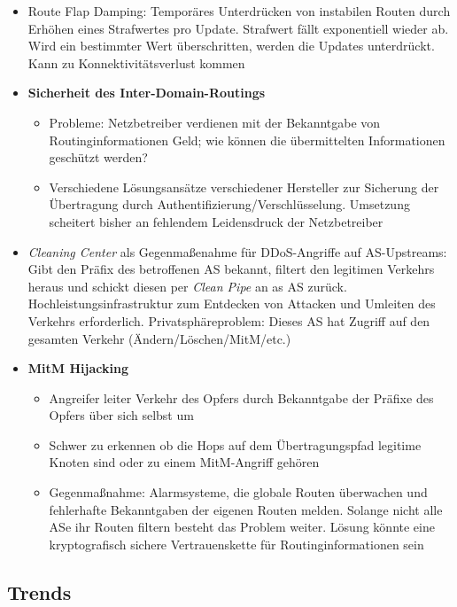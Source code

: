 \begin{itemize}
	\item Route Flap Damping: Temporäres Unterdrücken von instabilen Routen durch Erhöhen eines Strafwertes pro Update. Strafwert fällt exponentiell wieder ab. Wird ein bestimmter Wert überschritten, werden die Updates unterdrückt. Kann zu Konnektivitätsverlust kommen
	\item \textbf{Sicherheit des Inter-Domain-Routings}
	\begin{itemize}
		\item Probleme: Netzbetreiber verdienen mit der Bekanntgabe von Routinginformationen Geld; wie können die übermittelten Informationen geschützt werden?
		\item Verschiedene Lösungsansätze verschiedener Hersteller zur Sicherung der Übertragung durch Authentifizierung/Verschlüsselung. Umsetzung scheitert bisher an fehlendem Leidensdruck der Netzbetreiber
	\end{itemize}
	\item \textit{Cleaning Center} als Gegenmaßenahme für DDoS-Angriffe auf AS-Upstreams: Gibt den Präfix des betroffenen AS bekannt, filtert den legitimen Verkehrs heraus und schickt diesen per \textit{Clean Pipe} an as AS zurück. Hochleistungsinfrastruktur zum Entdecken von Attacken und Umleiten des Verkehrs erforderlich. Privatsphäreproblem: Dieses AS hat Zugriff auf den gesamten Verkehr (Ändern/Löschen/MitM/etc.)
	\item \textbf{MitM Hijacking}
	\begin{itemize}
		\item Angreifer leiter Verkehr des Opfers durch Bekanntgabe der Präfixe des Opfers über sich selbst um
		\item Schwer zu erkennen ob die Hops auf dem Übertragungspfad legitime Knoten sind oder zu einem MitM-Angriff gehören
		\item Gegenmaßnahme: Alarmsysteme, die globale Routen überwachen und fehlerhafte Bekanntgaben der eigenen Routen melden. Solange nicht alle ASe ihr Routen filtern besteht das Problem weiter. Lösung könnte eine kryptografisch sichere Vertrauenskette für Routinginformationen sein
	\end{itemize}
\end{itemize}


\subsection{Trends}


